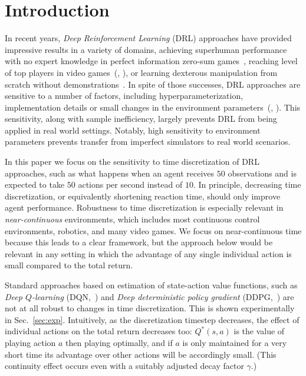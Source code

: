 
\section{Introduction}
\label{sec:intro}
In recent years, \emph{Deep Reinforcement Learning} (DRL) approaches have
provided impressive results in a variety of domains, achieving superhuman
performance with no expert knowledge in perfect information zero-sum
games~\cite{alphazero}, reaching level of top players in video
games~(\citealt{openai_five}, \citealt{dqn}), or learning dexterous manipulation
from scratch without demonstrations~\cite{hand_control}. 
In spite of those successes, DRL approaches are
sensitive to a number of factors, including hyperparameterization,
implementation details or small changes in the environment
parameters~(\citealt{drl_matter}, \citealt{drl_matter_bis}). This sensitivity,
along with sample inefficiency, largely prevents DRL from being applied in real
world settings. Notably, high sensitivity to environment parameters prevents
transfer from imperfect simulators to real world scenarios.

In this paper we focus on the sensitivity to time discretization of DRL
approaches, such as what happens when an agent receives $50$ observations
and is expected to take $50$ actions per second instead of $10$.
In principle, decreasing time discretization, or equivalently
shortening reaction time, should only improve agent performance.
Robustness to time discretization is especially relevant in
\emph{near-continuous} environments, which includes most continuous
control environments, robotics, and many video games.  
We focus on
near-continuous time because this leads to a clear framework, but the
approach below would be relevant in any setting in which the advantage of
any single individual action is small compared to the total return.%

Standard approaches based on estimation of state-action
value functions, such as
\emph{Deep $Q$-learning} (DQN,~\citealt{dqn}) and \emph{Deep deterministic policy
gradient} (DDPG,~\citealt{ddpg}) are not at all robust to changes in time discretization. This is shown experimentally in Sec.~\ref{sec:exp}. 
Intuitively, as the discretization timestep
decreases, the effect of individual actions on the total return decreases
too: $Q^*(s,a)$ is the value of playing action $a$ then playing optimally,
and if $a$ is only maintained for a very short time its advantage over
other actions will be accordingly small. (This continuity effect occurs even with a
suitably adjusted decay factor $\gamma$.)

